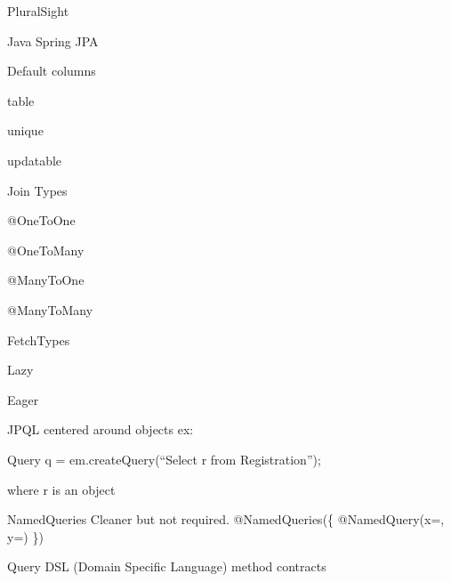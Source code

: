 \documentclass[presentation]{beamer}
\begin{document}
\begin{frame}[label={sec:org34d6546}]{PluralSight}
\begin{block}{Java Spring JPA}
\begin{block}{Default columns}
\begin{block}{table}
\end{block}
\begin{block}{unique}
\end{block}
\begin{block}{updatable}
\end{block}
\end{block}
\begin{block}{Join Types}
\begin{block}{@OneToOne}
\end{block}
\begin{block}{@OneToMany}
\end{block}
\begin{block}{@ManyToOne}
\end{block}
\begin{block}{@ManyToMany}
\end{block}
\end{block}
\begin{block}{FetchTypes}
\begin{block}{Lazy}
\end{block}
\begin{block}{Eager}
\end{block}
\end{block}
\begin{block}{JPQL}
centered around objects
ex:

Query q = em.createQuery(``Select r from Registration'');

where r is an object
\end{block}
\begin{block}{NamedQueries}
Cleaner but not required.
@NamedQueries(\{
    @NamedQuery(x=, y=)
\})
\end{block}
\begin{block}{Query DSL (Domain Specific Language)}
method contracts


\end{block}
\end{block}
\end{frame}
\end{document}
